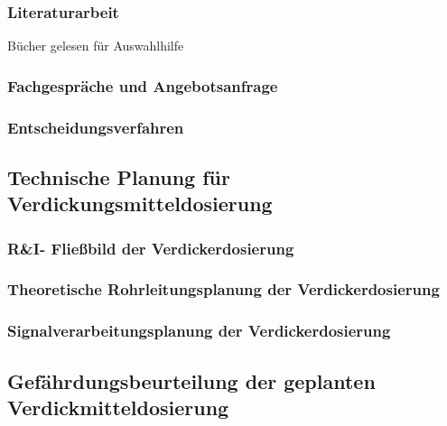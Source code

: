 \subsubsection{Literaturarbeit}
Bücher gelesen für Auswahlhilfe
\subsubsection{Fachgespräche und Angebotsanfrage}
\subsubsection{Entscheidungsverfahren}

\subsection{Technische Planung für Verdickungsmitteldosierung}
\subsubsection{R\&I- Fließbild der Verdickerdosierung}
\subsubsection{Theoretische Rohrleitungsplanung der Verdickerdosierung}
\subsubsection{Signalverarbeitungsplanung der Verdickerdosierung}

\subsection{Gefährdungsbeurteilung der geplanten Verdickmitteldosierung}


